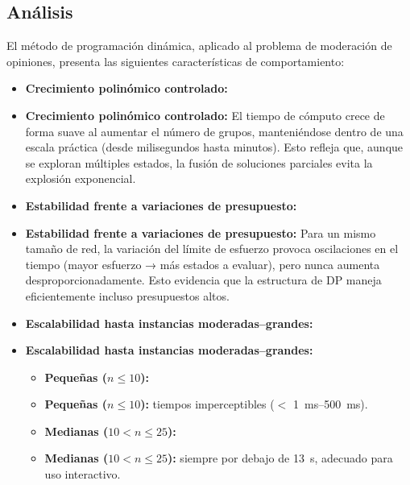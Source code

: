 \documentclass[11pt,letter]{article}
\begin{document}
    \subsection{Análisis}

    El método de programación dinámica, aplicado al problema de moderación de opiniones, presenta las siguientes características de comportamiento:

        \begin{itemize}

    \item \textbf{Crecimiento polinómico controlado:}

    \item \textbf{Crecimiento polinómico controlado:}
    El tiempo de cómputo crece de forma suave al aumentar el número de grupos, manteniéndose dentro de una escala práctica (desde milisegundos hasta minutos). Esto refleja que, aunque se exploran múltiples estados, la fusión de soluciones parciales evita la explosión exponencial.


    \item \textbf{Estabilidad frente a variaciones de presupuesto:}
    \item \textbf{Estabilidad frente a variaciones de presupuesto:}
    Para un mismo tamaño de red, la variación del límite de esfuerzo provoca oscilaciones en el tiempo (mayor esfuerzo → más estados a evaluar), pero nunca aumenta desproporcionadamente. Esto evidencia que la estructura de DP maneja eficientemente incluso presupuestos altos.

    \item \textbf{Escalabilidad hasta instancias moderadas–grandes:}

    \item \textbf{Escalabilidad hasta instancias moderadas–grandes:}

        \begin{itemize}

          \item \textbf{Pequeñas ($n \leq 10$):}

          \item \textbf{Pequeñas ($n \leq 10$):}
          tiempos imperceptibles ($<$ 1~ms–500~ms).

          \item \textbf{Medianas ($10 < n \leq 25$):}

          \item \textbf{Medianas ($10 < n \leq 25$):}
          siempre por debajo de 13~s, adecuado para uso interactivo.


\end{itemize}
\end{itemize}
\end{document}

